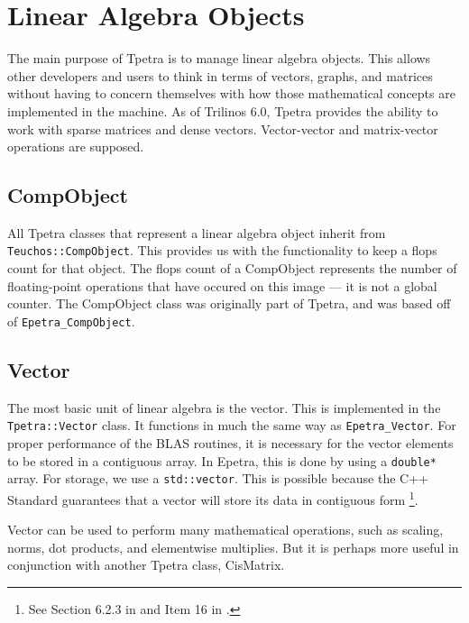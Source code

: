 \documentclass[10pt,relax]{TpetraDesign}
\begin{document}
%
\section{Linear Algebra Objects}

The main purpose of Tpetra is to manage linear algebra objects. This allows other developers and users to think in terms of vectors, graphs, and matrices without having to concern themselves with how those mathematical concepts are implemented in the machine. As of Trilinos 6.0, Tpetra provides the ability to work with sparse matrices and dense vectors. Vector-vector and matrix-vector operations are supposed.

%
\subsection{CompObject}
All Tpetra classes that represent a linear algebra object inherit from \texttt{Teuchos::CompObject}. This provides us with the functionality to keep a flops count for that object. The flops count of a CompObject represents the number of floating-point operations that have occured on this image --- it is not a global counter. The CompObject class was originally part of Tpetra, and was based off of \texttt{Epetra\_CompObject}. 

%
\subsection{Vector}
The most basic unit of linear algebra is the vector. This is implemented in the \texttt{Tpetra::Vector} class. It functions in much the same way as \texttt{Epetra\_Vector}. For proper performance of the BLAS routines, it is necessary for the vector elements to be stored in a contiguous array. In Epetra, this is done by using a \texttt{double*} array. For storage, we use a \texttt{std::vector}. This is possible because the C++ Standard guarantees that a vector will store its data in contiguous form \footnote{See Section 6.2.3 in \cite{Josuttis99} and Item 16 in \cite{Effective-STL}.}.

Vector can be used to perform many mathematical operations, such as scaling, norms, dot products, and elementwise multiplies. But it is perhaps more useful in conjunction with another Tpetra class, CisMatrix.
\end{document}
